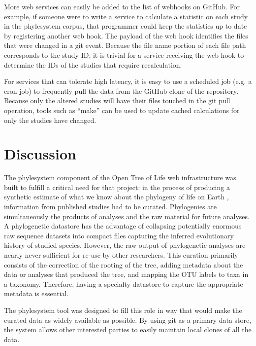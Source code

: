 \documentclass{bioinfo}
\newcommand{\ps}{phylesystem\xspace}
\newcommand{\otol}{Open Tree of Life\xspace}
\begin{document}
\begin{methods}
More web services can easily be added to the list of webhooks on GitHub.
For example, if someone were to write a service to calculate a statistic on each study in the \ps corpus, that
    programmer could keep the statistics up to date by registering another web hook.
The payload of the web hook identifies the files that were changed in a git event.
Because the file name portion of each file path corresponds to the study ID, it is trivial for a service
    receiving the web hook to determine the IDs of the studies that require recalculation.

For services that can tolerate high latency, it is easy to use a scheduled job (e.g. a cron job) to 
    frequently pull the data from the GitHub clone of the repository.
Because only the altered studies will have their files touched in the git pull operation, tools such
    as ``make'' can be used to update cached calculations for only the studies have changed.
\end{methods}

\section{Discussion}
The \ps component of the \otol web infrastructure was built to fulfill a critical need for that
    project: in the process of producing a synthetic estimate of what we know about the phylogeny
    of life on Earth \citep{}, information from published studies had to be curated.
Phylogenies are simultaneously the products of analyses and the raw material for future analyses.
A phylogenetic datastore has the advantage of collapsing potentially enormous raw sequence datasets
  into compact files capturing the inferred evolutionary history of studied species.
However, the raw output of phylogenetic analyses are nearly never sufficient for re-use by other researchers. 
This curation primarily consists of the correction of the rooting of the tree, adding metadata about the data
    or analyses that produced the tree, and mapping the OTU labels to taxa in a taxonomy.
Therefore, having a specialty datastore to capture the appropriate metadata is essential.

The \ps tool was designed to fill this role in way that would make the curated data as widely available
    as possible.
By using git as a primary data store, the system allows other interested parties to easily maintain
    local clones of all the data.
\end{document}
